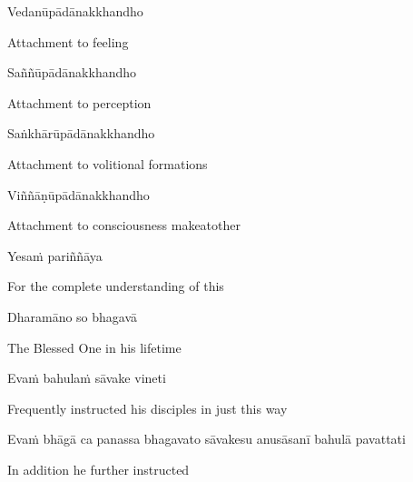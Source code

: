 Vedanūpādānakkhandho

\begin{english}
  Attachment to feeling
\end{english}

Saññūpādānakkhandho

\begin{english}
  Attachment to perception
\end{english}

Saṅkhārūpādānakkhandho

\begin{english}
    Attachment to volitional formations\makeatletter\hyperlink{endnote16-appendix}\makeatother

\end{english}

Viññāṇūpādānakkhandho

\begin{english}
    Attachment to consciousness\makeatletter\hyperlink{endnote17-appendix}\makeatother
  makeatother
\end{english}

Yesaṁ pariññāya

\begin{english}
  For the complete understanding of this
\end{english}

Dharamāno so bhagavā

\begin{english}
  The Blessed One in his lifetime
\end{english}

Evaṁ bahulaṁ sāvake vineti

\begin{english}
  Frequently instructed his disciples in just this way
\end{english}

\begin{pali-hang}
  Evaṁ bhāgā ca panassa bhagavato sāvakesu anusāsanī bahulā pavattati
\end{pali-hang}

\begin{english}
  In addition he further instructed
\end{english}

